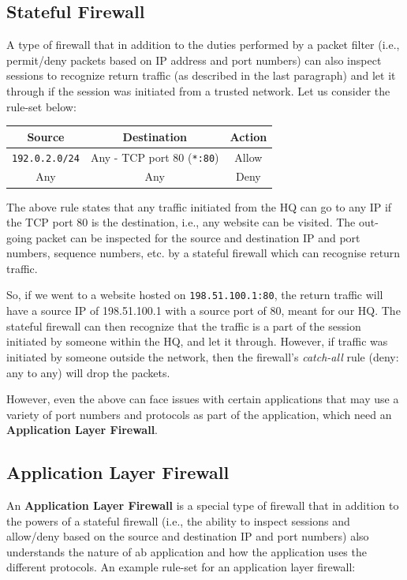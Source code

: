 \subsection{Stateful Firewall}
\vspace{-5pt}
A type of firewall that in addition to the duties performed by a packet filter (i.e., permit/deny packets based on IP address and port numbers) can also inspect sessions to recognize return traffic (as described in the last paragraph) and let it through if the session was initiated from a trusted network. Let us consider the rule-set below:

\vspace{-5pt}
\begin{center}
	\begin{tabular}{ccc}
		\toprule
		\textbf{Source} &\textbf{Destination} &\textbf{Action} \\
		\midrule
		\verb|192.0.2.0/24| &Any - TCP port 80 (\verb|*:80|) &Allow \\
		Any &Any &Deny \\
		\bottomrule	
	\end{tabular}
\end{center}
\vspace{-10pt}

\noindent
The above rule states that any traffic initiated from the HQ can go to any IP if the TCP port 80 is the destination, i.e., any website can be visited. The out-going packet can be inspected for the source and destination IP and port numbers, sequence numbers, etc. by a stateful firewall which can recognise return traffic. 

So, if we went to a website hosted on \verb|198.51.100.1:80|, the return traffic will have a source IP of 198.51.100.1 with a source port of 80, meant for our HQ. The stateful firewall can then recognize that the traffic is a part of the session initiated by someone within the HQ, and let it through. However, if traffic was initiated by someone outside the network, then the firewall's \textit{catch-all} rule (deny: any to any) will drop the packets. 

However, even the above can face issues with certain applications that may use a variety of port numbers and protocols as part of the application, which need an \textbf{Application Layer Firewall}. 

\subsection{Application Layer Firewall}
An \textbf{Application Layer Firewall} is a special type of firewall that in addition to the powers of a stateful firewall (i.e., the ability to inspect sessions and allow/deny based on the source and destination IP and port numbers) also understands the nature of ab application and how the application uses the different protocols. An example rule-set for an application layer firewall:

